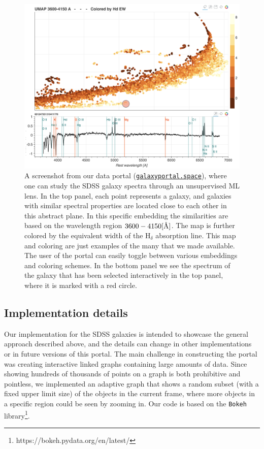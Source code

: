 \documentclass[fleqn,usenatbib]{mnras}
\newcommand{\angstrom}{\mbox{\normalfont\AA}}
\newcommand{\gtoast}{\href{https://galaxyportal.space/}{\texttt{galaxyportal.space}}}
\begin{document}
{\begin{figure}
  \begin{center}
  \includegraphics[width=\columnwidth]{icon.png}
  \caption{A screenshot from our data portal (\gtoast{}), where one can study the SDSS galaxy spectra through an unsupervised ML lens. In the top panel, each point represents a galaxy, and galaxies with similar spectral properties  are located close to each other in this abstract plane. In this specific embedding the similarities  are based on the wavelength region  $3600 - 4150 [\angstrom]$. The map is further colored by the equivalent width of the H$_{\delta}$ absorption line. This map and coloring are just examples of the many that we made available. The user of the portal can easily toggle between various embeddings and coloring schemes. In the bottom panel we see the spectrum of the galaxy that has been selected interactively in the top panel, where it is marked with a red circle. 
  } \label{fig:screen}
  \end{center}
\end{figure}

\subsection{Implementation details}
\label{sec:2de}


Our implementation for the SDSS galaxies is intended to showcase the general approach described above, and  the details can change in other implementations or in future versions of this portal. The main challenge in constructing the portal was creating  interactive linked graphs containing large amounts of data. Since showing hundreds of thousands of points on a graph is both prohibitive and pointless, we implemented an adaptive graph that shows a random subset (with a fixed  upper limit size) of the objects in the current frame, where more objects in a specific region could be seen by zooming in. Our code is based on the \texttt{Bokeh}  library\footnote{https://bokeh.pydata.org/en/latest/}.





}
\end{document}
